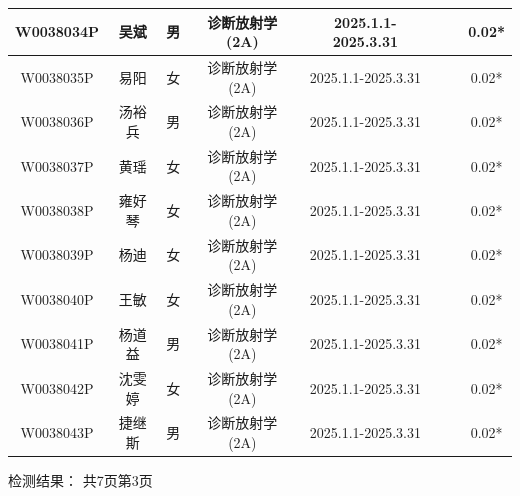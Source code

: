 \begin{table}[H]
\begin{tabular}{|c|c|c|c|c|c|c|c|}
\hline
W0038034P & 吴斌 & 男 & 诊断放射学(2A) & 2025.1.1-2025.3.31 &  &  & 0.02* \\
\hline
W0038035P & 易阳 & 女 & 诊断放射学(2A) & 2025.1.1-2025.3.31 &  &  & 0.02* \\
\hline
W0038036P & 汤裕兵 & 男 & 诊断放射学(2A) & 2025.1.1-2025.3.31 &  &  & 0.02* \\
\hline
W0038037P & 黄瑶 & 女 & 诊断放射学(2A) & 2025.1.1-2025.3.31 &  &  & 0.02* \\
\hline
W0038038P & 雍好琴 & 女 & 诊断放射学(2A) & 2025.1.1-2025.3.31 &  &  & 0.02* \\
\hline
W0038039P & 杨迪 & 女 & 诊断放射学(2A) & 2025.1.1-2025.3.31 &  &  & 0.02* \\
\hline
W0038040P & 王敏 & 女 & 诊断放射学(2A) & 2025.1.1-2025.3.31 &  &  & 0.02* \\
\hline
W0038041P & 杨道益 & 男 & 诊断放射学(2A) & 2025.1.1-2025.3.31 &  &  & 0.02* \\
\hline
W0038042P & 沈雯婷 & 女 & 诊断放射学(2A) & 2025.1.1-2025.3.31 &  &  & 0.02* \\
\hline
W0038043P & 捷继斯 & 男 & 诊断放射学(2A) & 2025.1.1-2025.3.31 &  &  & 0.02* \\
\hline
\end{tabular}
\end{table}


检测结果：
共7页第3页

